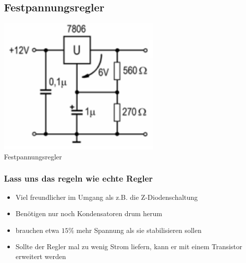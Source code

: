 \subsection*{Festpannungsregler}
\begin{frame}
    \begin{center}
        \includegraphics[width=0.6\textwidth]{a17/TD319.png}\\
       Festpannungsregler \cite{bna}
    \end{center}
\end{frame}

\begin{frame}
\frametitle{Lass uns das regeln wie echte Regler}
\begin{itemize}
	\item	Viel freundlicher im Umgang als z.B. die Z-Diodenschaltung
	\item	Benötigen nur noch Kondensatoren drum herum
	\item	brauchen etwa $15 \%$ mehr Spannung als sie stabilisieren sollen
	\item	Sollte der Regler mal zu wenig Strom liefern, kann er mit einem Transistor erweitert werden
\end{itemize}
\end{frame}

